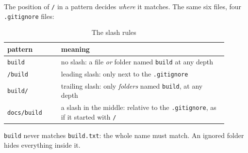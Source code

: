 \documentclass[11pt,a4paper]{article}
\begin{document}
The position of \texttt{/} in a pattern decides \emph{where} it matches. The same six files, four \texttt{.gitignore} files:

\noindent
\begin{minipage}[t]{0.49\linewidth}

\end{minipage}\hfill
\begin{minipage}[t]{0.49\linewidth}

\end{minipage}

\medskip

\noindent
\begin{minipage}[t]{0.49\linewidth}

\end{minipage}\hfill
\begin{minipage}[t]{0.49\linewidth}

\end{minipage}


\begin{table}[h]
\centering\small
\begin{tabular}{@{}L{0.22\linewidth}L{0.68\linewidth}@{}}
  \toprule
  \textbf{pattern}       & \textbf{meaning} \\
  \midrule
  \texttt{build}         & no slash: a file \emph{or} folder named \texttt{build} at any depth \\
  \texttt{/build}        & leading slash: only next to the \texttt{.gitignore} \\
  \texttt{build/}        & trailing slash: only \emph{folders} named \texttt{build}, at any depth \\
  \texttt{docs/build}    & a slash in the middle: relative to the \texttt{.gitignore}, as if it started with \texttt{/} \\
  \bottomrule
\end{tabular}
\caption{The slash rules}
\end{table}%

\texttt{build} never matches \texttt{build.txt}: the whole name must match. An ignored folder hides everything inside it.
\end{document}
